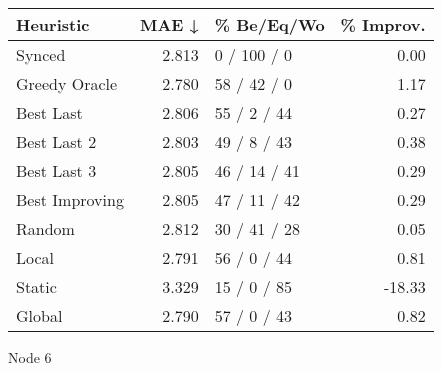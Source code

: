 \begin{tabular}{lrlr}
\toprule
\textbf{Heuristic} & \textbf{MAE ↓} & \textbf{\% Be/Eq/Wo} & \textbf{\% Improv.} \\
\midrule
            Synced &          2.813 &          0 / 100 / 0 &                0.00 \\
     Greedy Oracle &          2.780 &          58 / 42 / 0 &                1.17 \\
         Best Last &          2.806 &          55 / 2 / 44 &                0.27 \\
       Best Last 2 &          2.803 &          49 / 8 / 43 &                0.38 \\
       Best Last 3 &          2.805 &         46 / 14 / 41 &                0.29 \\
    Best Improving &          2.805 &         47 / 11 / 42 &                0.29 \\
            Random &          2.812 &         30 / 41 / 28 &                0.05 \\
             Local &          2.791 &          56 / 0 / 44 &                0.81 \\
            Static &          3.329 &          15 / 0 / 85 &              -18.33 \\
            Global &          2.790 &          57 / 0 / 43 &                0.82 \\
\bottomrule
\end{tabular}
\caption{Node 6}
\label{tab:hr_iid_lr01_le1_bs4_6}
